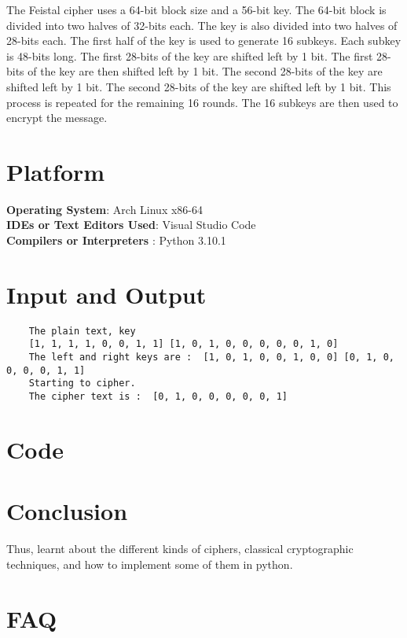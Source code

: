 \documentclass[11pt]{article}
\begin{document}
The Feistal cipher uses a 64-bit block size and a 56-bit key. The 64-bit block is divided into two halves of 32-bits each. The key is also divided into two halves of 28-bits each. The first half of the key is used to generate 16 subkeys. Each subkey is 48-bits long. The first 28-bits of the key are shifted left by 1 bit. The first 28-bits of the key are then shifted left by 1 bit. The second 28-bits of the key are shifted left by 1 bit. The second 28-bits of the key are shifted left by 1 bit. This process is repeated for the remaining 16 rounds. The 16 subkeys are then used to encrypt the message.

\section{Platform}
\textbf{Operating System}: Arch Linux x86-64 \\
\textbf{IDEs or Text Editors Used}: Visual Studio Code\\
\textbf{Compilers or Interpreters} : Python 3.10.1\\

\section{Input and Output}
\begin{verbatim}
    The plain text, key
    [1, 1, 1, 1, 0, 0, 1, 1] [1, 0, 1, 0, 0, 0, 0, 0, 1, 0]
    The left and right keys are :  [1, 0, 1, 0, 0, 1, 0, 0] [0, 1, 0, 0, 0, 0, 1, 1]
    Starting to cipher. 
    The cipher text is :  [0, 1, 0, 0, 0, 0, 0, 1]
\end{verbatim}
\section{Code}


\section{Conclusion}
Thus, learnt about the different kinds of ciphers, classical cryptographic techniques, and how to implement some of them in python.
\clearpage

\section{FAQ}
\end{document}

